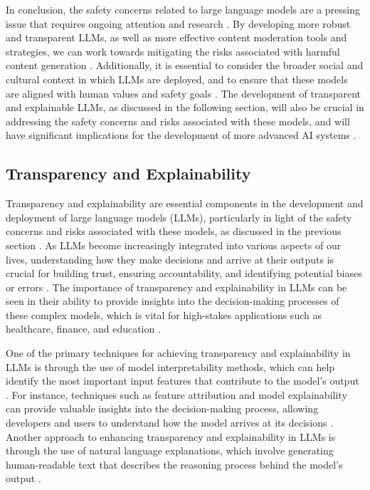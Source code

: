 \documentclass[11pt]{article}
\begin{document}
In conclusion, the safety concerns related to large language models are a pressing issue that requires ongoing attention and research \cite{ref339}. By developing more robust and transparent LLMs, as well as more effective content moderation tools and strategies, we can work towards mitigating the risks associated with harmful content generation \cite{ref340}. Additionally, it is essential to consider the broader social and cultural context in which LLMs are deployed, and to ensure that these models are aligned with human values and safety goals \cite{ref341}. The development of transparent and explainable LLMs, as discussed in the following section, will also be crucial in addressing the safety concerns and risks associated with these models, and will have significant implications for the development of more advanced AI systems \cite{ref342}.

\subsection{Transparency and Explainability}

Transparency and explainability are essential components in the development and deployment of large language models (LLMs), particularly in light of the safety concerns and risks associated with these models, as discussed in the previous section \cite{ref265}. As LLMs become increasingly integrated into various aspects of our lives, understanding how they make decisions and arrive at their outputs is crucial for building trust, ensuring accountability, and identifying potential biases or errors \cite{ref343}. The importance of transparency and explainability in LLMs can be seen in their ability to provide insights into the decision-making processes of these complex models, which is vital for high-stakes applications such as healthcare, finance, and education \cite{ref36}.

One of the primary techniques for achieving transparency and explainability in LLMs is through the use of model interpretability methods, which can help identify the most important input features that contribute to the model's output \cite{ref270}. For instance, techniques such as feature attribution and model explainability can provide valuable insights into the decision-making process, allowing developers and users to understand how the model arrives at its decisions \cite{ref265}. Another approach to enhancing transparency and explainability in LLMs is through the use of natural language explanations, which involve generating human-readable text that describes the reasoning process behind the model's output \cite{ref343}.
\end{document}
